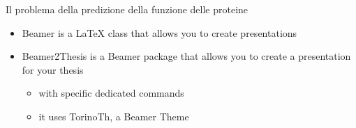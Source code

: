\titlepageframe
\begin{tframe}{Il problema della predizione della funzione delle proteine}
\begin{itemize}
\item Beamer is a \LaTeX{} class that allows you to create presentations
\item Beamer2Thesis is a Beamer package that allows you to create a presentation for your thesis
\begin{itemize}
\item with specific dedicated commands
\item it uses TorinoTh, a Beamer Theme
\end{itemize}
\end{itemize}
\end{tframe}
